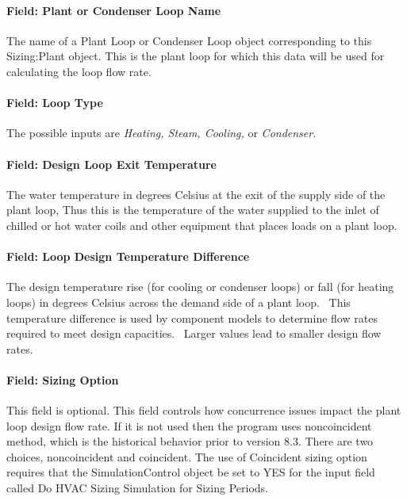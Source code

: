 \paragraph{Field: Plant or Condenser Loop Name}\label{field-plant-or-condenser-loop-name}

The name of a Plant Loop or Condenser Loop object corresponding to this Sizing:Plant object. This is the plant loop for which this data will be used for calculating the loop flow rate.

\paragraph{Field: Loop Type}\label{field-loop-type}

The possible inputs are \emph{Heating, Steam, Cooling,} or \emph{Condenser}.

\paragraph{Field: Design Loop Exit Temperature}\label{field-design-loop-exit-temperature}

The water temperature in degrees Celsius at the exit of the supply side of the plant loop, Thus this is the temperature of the water supplied to the inlet of chilled or hot water coils and other equipment that places loads on a plant loop.

\paragraph{Field: Loop Design Temperature Difference}\label{field-loop-design-temperature-difference}

The design temperature rise (for cooling or condenser loops) or fall (for heating loops) in degrees Celsius across the demand side of a plant loop.~ This temperature difference is used by component models to determine flow rates required to meet design capacities.~ Larger values lead to smaller design flow rates.

\paragraph{Field: Sizing Option}\label{field-sizing-option}

This field is optional. This field controls how concurrence issues impact the plant loop design flow rate. If it is not used then the program uses noncoincident method, which is the historical behavior prior to version 8.3. There are two choices, noncoincident and coincident. The use of Coincident sizing option requires that the SimulationControl object be set to YES for the input field called Do HVAC Sizing Simulation for Sizing Periods.

